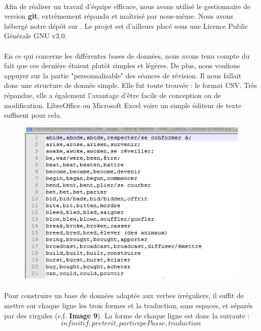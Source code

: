 \documentclass[12pt, a4paper]{report}
\newcommand{\MYhref}[3][blue]{\href{#2}{\color{#1}{#3}}}%
\begin{document}
\paragraph{}Afin de réaliser un travail d'équipe efficace, nous avons utilisé le gestionnaire de version \textbf{git}, extrêmement répandu et maîtrisé par nous-même. Nous avons hébergé notre dépôt sur \MYhref{https://github.com/AOSauron}{\textit{GitHub}}. Le projet est d'ailleurs placé sous une Licence Public Générale GNU v3.0.
\newpage
\paragraph{}En ce qui concerne les différentes bases de données, nous avons tenu compte du fait que ces dernière étaient plutôt simples et légères. De plus, nous voulions appuyer sur la partie "personnalisable" des séances de révision. Il nous fallait donc une structure de donnée simple. Elle fut toute trouvée : le format CSV. Très répandue, elle a également l'avantage d'être facile de conception ou de modification. LibreOffice ou Microsoft Excel voire un simple éditeur de texte suffisent pour cela.


\begin{figure}[H]
    \centering
    \includegraphics[scale=0.80]{images/csv.png}
\end{figure}

\paragraph{}Pour construire un base de données adaptée aux verbes irréguliers, il suffit de mettre sur chaque ligne les trois formes et la traduction, sans espaces, et séparés par des virgules (c.f. \textbf{Image 9}). La forme de chaque ligne est donc la suivante :
\[infinitif,preterit,participePasse,traduction\]
\end{document}
